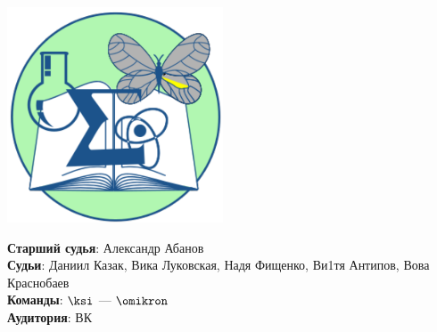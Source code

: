 \documentclass[12pt]{article}
\begin{document}
\begin{minipage}{.30\textwidth}
\begin{center}
\includegraphics[width=0.48\textwidth]{klshlogo.pdf}
\end{center}
\end{minipage}
\begin{minipage}{.65\textwidth}
\begin{flushleft}
{\bf Старший судья}: Александр Абанов\\ 
{\bf Судьи}: Даниил Казак, Вика Луковская, Надя Фищенко, Ви1тя Антипов, Вова Краснобаев\\ 
{\bf Команды}: $\ksi$ --- $\omikron$\\ 
{\bf Аудитория}: ВК\\ 
\end{flushleft}
\end{minipage}
\end{document}
